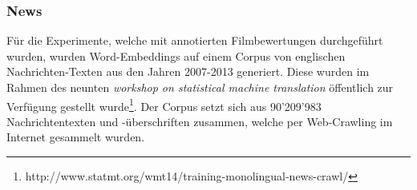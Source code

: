 \subsubsection{News}
Für die Experimente, welche mit annotierten Filmbewertungen durchgeführt wurden, wurden Word-Embeddings auf einem Corpus von englischen Nachrichten-Texten aus den Jahren 2007-2013 generiert. Diese wurden im Rahmen des neunten \emph{workshop on statistical machine translation} öffentlich zur Verfügung gestellt wurde\footnote{http://www.statmt.org/wmt14/training-monolingual-news-crawl/}. Der Corpus setzt sich aus 90'209'983 Nachrichtentexten und -überschriften zusammen, welche per Web-Crawling im Internet gesammelt wurden.